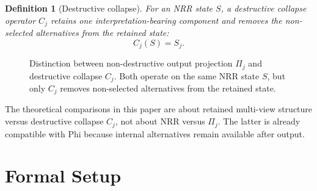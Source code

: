 \documentclass[11pt,a4paper]{article}
\newtheorem{definition}{Definition}
\begin{document}
\begin{definition}[Destructive collapse]
For an NRR state $S$, a destructive collapse operator $C_j$ retains one interpretation-bearing component and removes the non-selected alternatives from the retained state:
\begin{equation}
C_j(S) = S_j.
\end{equation}
\end{definition}

\begin{figure}[t]
\centering
{}
\caption{Distinction between non-destructive output projection $\Pi_j$ and destructive collapse $C_j$. Both operate on the same NRR state $S$, but only $C_j$ removes non-selected alternatives from the retained state.}
\label{fig:projection_vs_collapse}
\end{figure}

The theoretical comparisons in this paper are about retained multi-view structure versus destructive collapse $C_j$, not about NRR versus $\Pi_j$. The latter is already compatible with Phi because internal alternatives remain available after output.

\section{Formal Setup}
\label{sec:setup}
\end{document}
